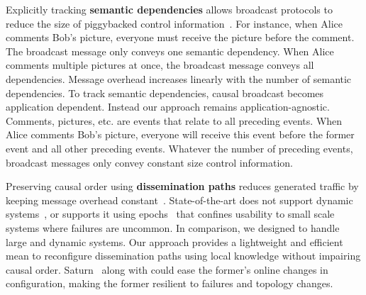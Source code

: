 \noindent Explicitly tracking \textbf{semantic dependencies} allows broadcast
protocols to reduce the size of piggybacked control
information~\cite{bailis2013bolton,lloyd2011cops,mukund2014optimized}. For
instance, when Alice comments Bob's picture, everyone must receive the picture
before the comment. The broadcast message only conveys one semantic
dependency. When Alice comments multiple pictures at once, the broadcast message
conveys all dependencies.  Message overhead increases linearly with the number
of semantic dependencies. To track semantic dependencies, causal broadcast
becomes application dependent. Instead our approach remains
application-agnostic. Comments, pictures, etc. are events that relate to all
preceding events. When Alice comments Bob's picture, everyone will receive this
event before the former event and all other preceding events. Whatever the
number of preceding events, broadcast messages only convey constant size control
information.

\noindent Preserving causal order using \textbf{dissemination paths} reduces
generated traffic by keeping message overhead
constant~\cite{bravo2017saturn,friedman2004causal}. State-of-the-art does not
support dynamic systems~\cite{friedman2004causal}, or supports it using
epochs~\cite{bravo2017saturn} that confines usability to small scale systems
where failures are uncommon. In comparison, we designed \CBROADCAST to handle
large and dynamic systems. Our approach provides a lightweight and efficient
mean to reconfigure dissemination paths using local knowledge without impairing
causal order.  Saturn~\cite{bravo2017saturn} along with \CBROADCAST could ease
the former's online changes in configuration, making the former resilient to
failures and topology changes.




